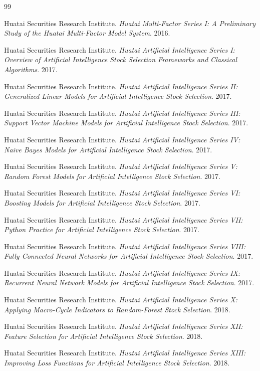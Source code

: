 \documentclass[letterpaper,11pt]{article}
\begin{document}
\begin{thebibliography}{99}

Huatai Securities Research Institute.
\textit{Huatai Multi-Factor Series I: A Preliminary Study of the Huatai Multi-Factor Model System}.
2016.

Huatai Securities Research Institute.
\textit{Huatai Artificial Intelligence Series I: Overview of Artificial Intelligence Stock Selection Frameworks and Classical Algorithms}.
2017.

Huatai Securities Research Institute.
\textit{Huatai Artificial Intelligence Series II: Generalized Linear Models for Artificial Intelligence Stock Selection}.
2017.

Huatai Securities Research Institute.
\textit{Huatai Artificial Intelligence Series III: Support Vector Machine Models for Artificial Intelligence Stock Selection}.
2017.

Huatai Securities Research Institute.
\textit{Huatai Artificial Intelligence Series IV: Naive Bayes Models for Artificial Intelligence Stock Selection}.
2017.

Huatai Securities Research Institute.
\textit{Huatai Artificial Intelligence Series V: Random Forest Models for Artificial Intelligence Stock Selection}.
2017.

Huatai Securities Research Institute.
\textit{Huatai Artificial Intelligence Series VI: Boosting Models for Artificial Intelligence Stock Selection}.
2017.

Huatai Securities Research Institute.
\textit{Huatai Artificial Intelligence Series VII: Python Practice for Artificial Intelligence Stock Selection}.
2017.

Huatai Securities Research Institute.
\textit{Huatai Artificial Intelligence Series VIII: Fully Connected Neural Networks for Artificial Intelligence Stock Selection}.
2017.

Huatai Securities Research Institute.
\textit{Huatai Artificial Intelligence Series IX: Recurrent Neural Network Models for Artificial Intelligence Stock Selection}.
2017.

Huatai Securities Research Institute.
\textit{Huatai Artificial Intelligence Series X: Applying Macro-Cycle Indicators to Random-Forest Stock Selection}.
2018.

Huatai Securities Research Institute.
\textit{Huatai Artificial Intelligence Series XII: Feature Selection for Artificial Intelligence Stock Selection}.
2018.

Huatai Securities Research Institute.
\textit{Huatai Artificial Intelligence Series XIII: Improving Loss Functions for Artificial Intelligence Stock Selection}.
2018.

\end{thebibliography}
\end{document}
